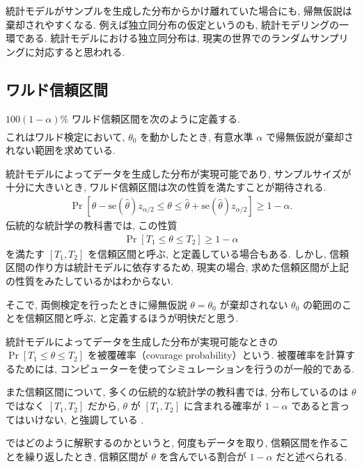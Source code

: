 \documentclass[a4paper, 12pt]{jarticle}
\begin{document}
統計モデルがサンプルを生成した分布からかけ離れていた場合にも, 帰無仮説は棄却されやすくなる. 
例えば独立同分布の仮定というのも, 統計モデリングの一環である. 
統計モデルにおける独立同分布は, 現実の世界でのランダムサンプリングに対応すると思われる. 

\subsection{ワルド信頼区間}
$100(1-\alpha)$\% ワルド信頼区間を次のように定義する.
\begin{align}
[\hat \theta - \mathrm{se}(\hat \theta)z_{\alpha/2}, \hat \theta +  \mathrm{se}(\hat \theta)z_{\alpha/2}]
\label{Waldstat}
\end{align}
これはワルド検定において, $\theta_0$ を動かしたとき, 有意水準 $\alpha$ で帰無仮説が棄却されない範囲を求めている. 

統計モデルによってデータを生成した分布が実現可能であり, サンプルサイズが十分に大きいとき, ワルド信頼区間は次の性質を満たすことが期待される. 
\begin{align}
\Pr[\hat \theta - \mathrm{se}(\hat \theta)z_{\alpha/2} \le \theta \le \hat \theta +  \mathrm{se}(\hat \theta)z_{\alpha/2}] \ge 1-\alpha.
\end{align}
伝統的な統計学の教科書では, この性質 
\begin{align}
\Pr[T_1 \le \theta\le T_2] \ge 1-\alpha
\label{CI}
\end{align}
を満たす $[T_1, T_2]$ を信頼区間と呼ぶ, と定義している場合もある. 
しかし, 信頼区間の作り方は統計モデルに依存するため, 現実の場合, 求めた信頼区間が上記の性質をみたしているかはわからない. 

そこで, 両側検定を行ったときに帰無仮説 $\theta = \theta_0$ が棄却されない $\theta_0$ の範囲のことを信頼区間と呼ぶ, と定義するほうが明快だと思う.

統計モデルによってデータを生成した分布が実現可能なときの $\Pr[T_1 \le \theta\le T_2]$ を被覆確率（covarage probability）という.
被覆確率を計算するためには, コンピューターを使ってシミュレーションを行うのが一般的である.
 
また信頼区間について, 多くの伝統的な統計学の教科書では, 分布しているのは $\theta$ ではなく $[T_1, T_2]$ だから, $\theta$ が $[T_1, T_2]$ に含まれる確率が $1-\alpha$ であると言ってはいけない, と強調している . 

ではどのように解釈するのかというと, 何度もデータを取り, 信頼区間を作ることを繰り返したとき, 信頼区間が $\theta$ を含んでいる割合が $1-\alpha$ だと述べられる.
\end{document}
